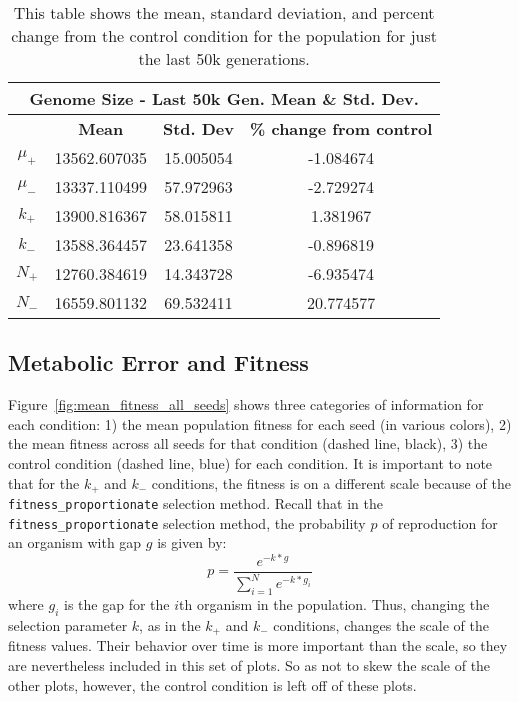 \begin{table}[H]
	\begin{tabular}{|c|c|c|c|}
		\hline
		\multicolumn{4}{c}{\textbf{Genome Size - Last 50k Gen. Mean \& Std. Dev.}} \\
		\hline
		& \textbf{Mean} & \textbf{Std. Dev} & \textbf{\% change from control} \\
		\hline
		$\mu_+$ & 13562.607035 & 15.005054 & -1.084674 \\ 
		\hline
		$\mu_-$ & 13337.110499 & 57.972963 & -2.729274 \\ 
		\hline
		$k_+$ & 13900.816367 & 58.015811 & 1.381967 \\ 
		\hline
		$k_-$ & 13588.364457 & 23.641358 & -0.896819 \\ 
		\hline
		$N_+$ & 12760.384619 & 14.343728 & -6.935474 \\ 
		\hline
		$N_-$ & 16559.801132 & 69.532411 & 20.774577 \\ 
		\hline
	\end{tabular}
	\caption[Genome size - last 50k generations mean \& std. dev.]{This table shows the mean, standard deviation, and percent change from the control condition for the population for just the last 50k generations.}
	\label{table:genome_size_stats_last_50k}
\end{table}


\subsection{Metabolic Error and Fitness}\label{res:metabolic_error_and_fitness}
Figure~\ref{fig:mean_fitness_all_seeds} shows three categories of information for each condition: 1) the mean population fitness for each seed (in various colors), 2) the mean fitness across all seeds for that condition (dashed line, black), 3) the control condition (dashed line, blue) for each condition. It is important to note that for the $k_+$ and $k_-$ conditions, the fitness is on a different scale because of the \texttt{fitness\_proportionate} selection method. Recall that in the \texttt{fitness\_proportionate} selection method, the probability $p$ of reproduction for an organism with gap $g$ is given by:
\begin{equation*}
p = \frac{e^{-k*g}}{\sum_{i=1}^{N}e^{-k*g_i}}
\end{equation*}
where $g_i$ is the gap for the $i$th organism in the population. Thus, changing the selection parameter $k$, as in the $k_+$ and $k_-$ conditions, changes the scale of the fitness values. Their behavior over time is more important than the scale, so they are nevertheless included in this set of plots. So as not to skew the scale of the other plots, however, the control condition is left off of these plots. 

